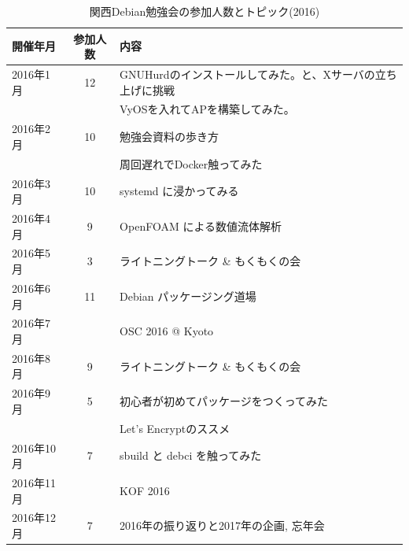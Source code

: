 \documentclass[mingoth,a4paper]{jsarticle}
\begin{document}
\begin{table}
    \caption{関西Debian勉強会の参加人数とトピック(2016)}
    \label{tab:count2016kansai}
    \begin{center}
      \begin{tabular}{|l|c|l|}
        \hline
        開催年月  & 参加人数 & 内容 \\
        \hline
        2016年1月 & 12    & GNUHurdのインストールしてみた。と、Xサーバの立ち上げに挑戦 \\
                  &       & VyOSを入れてAPを構築してみた。\\
        2016年2月 & 10    & 勉強会資料の歩き方 \\
                  &       & 周回遅れでDocker触ってみた \\
        2016年3月 & 10    & systemd に浸かってみる \\
        2016年4月 & 9     & OpenFOAM による数値流体解析 \\
        2016年5月 & 3     & ライトニングトーク \& もくもくの会  \\
        2016年6月 & 11    & Debian パッケージング道場\\
        2016年7月 &       & OSC 2016 @ Kyoto \\
        2016年8月 & 9     & ライトニングトーク \& もくもくの会 \\
        2016年9月 & 5     & 初心者が初めてパッケージをつくってみた \\
                  &       & Let's Encryptのススメ \\
        2016年10月& 7     & sbuild と debci を触ってみた \\
        2016年11月&       & KOF 2016 \\
        2016年12月& 7      & 2016年の振り返りと2017年の企画, 忘年会 \\
        \hline
      \end{tabular}
    \end{center}
\end{table}

\pagebreak
\end{document}
